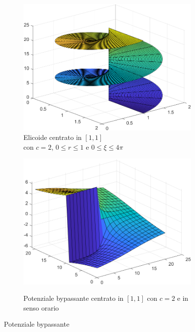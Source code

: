 \documentclass[14pt,a4paper]{extarticle}
\begin{document}
\begin{figure}[H]
\begin{subfigure}[t]{0.5\textwidth}
\caption{Elicoide centrato in \([1,1]\) \\ con \(c=2\), \(0\leq r \leq 1\) e \(0 \leq \xi \leq 4\pi\)}
\includegraphics[width=\textwidth]{elicoide.png}
\end{subfigure}
\hfill
\begin{subfigure}[t]{0.5\textwidth}
\caption{Potenziale bypassante centrato in \([1,1]\) con \(c=2\) e in senso orario}
\includegraphics[width=\textwidth]{potB.png}
\label{potB}
\end{subfigure}
\caption{Potenziale bypassante}
\end{figure}
\end{document}

